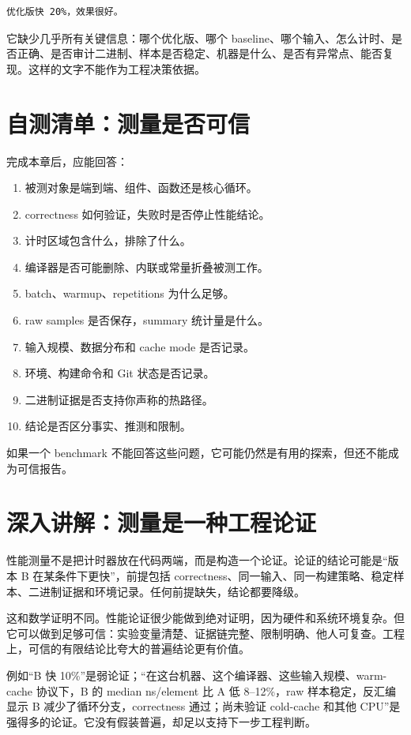 \begin{lstlisting}
优化版快 20%，效果很好。
\end{lstlisting}

它缺少几乎所有关键信息：哪个优化版、哪个 baseline、哪个输入、怎么计时、是否正确、是否审计二进制、样本是否稳定、机器是什么、是否有异常点、能否复现。这样的文字不能作为工程决策依据。

\section{自测清单：测量是否可信}

完成本章后，应能回答：

\begin{enumerate}
  \item 被测对象是端到端、组件、函数还是核心循环。
  \item correctness 如何验证，失败时是否停止性能结论。
  \item 计时区域包含什么，排除了什么。
  \item 编译器是否可能删除、内联或常量折叠被测工作。
  \item batch、warmup、repetitions 为什么足够。
  \item raw samples 是否保存，summary 统计量是什么。
  \item 输入规模、数据分布和 cache mode 是否记录。
  \item 环境、构建命令和 Git 状态是否记录。
  \item 二进制证据是否支持你声称的热路径。
  \item 结论是否区分事实、推测和限制。
\end{enumerate}

如果一个 benchmark 不能回答这些问题，它可能仍然是有用的探索，但还不能成为可信报告。

\section{深入讲解：测量是一种工程论证}

性能测量不是把计时器放在代码两端，而是构造一个论证。论证的结论可能是“版本 B 在某条件下更快”，前提包括 correctness、同一输入、同一构建策略、稳定样本、二进制证据和环境记录。任何前提缺失，结论都要降级。

这和数学证明不同。性能论证很少能做到绝对证明，因为硬件和系统环境复杂。但它可以做到足够可信：实验变量清楚、证据链完整、限制明确、他人可复查。工程上，可信的有限结论比夸大的普遍结论更有价值。

例如“B 快 10\%”是弱论证；“在这台机器、这个编译器、这些输入规模、warm-cache 协议下，B 的 median ns/element 比 A 低 8–12\%，raw 样本稳定，反汇编显示 B 减少了循环分支，correctness 通过；尚未验证 cold-cache 和其他 CPU”是强得多的论证。它没有假装普遍，却足以支持下一步工程判断。

